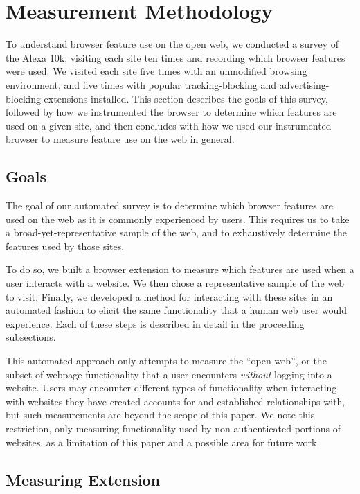 \section{Measurement Methodology}
\label{measurement:methodology}

To understand browser feature use on the open web, we conducted a survey of the
Alexa 10k, visiting each site ten times and recording which browser features
were used.  We visited each site five times with an unmodified browsing
environment, and five times with popular tracking-blocking and
advertising-blocking extensions installed.  This section describes
the goals of this survey, followed by how we instrumented the browser to
determine which features are used on a given site, and then concludes with how
we used our instrumented browser to measure feature use on the web in general.


\subsection{Goals}
The goal of our automated survey is to determine which browser features
are used on the web as it is commonly experienced by users.  This requires us
to take a broad-yet-representative sample of the web, and to exhaustively
determine the features used by those sites.

To do so, we built a browser extension to measure which features are used when
a user interacts with a website. We then chose a representative sample of the
web to visit.  Finally, we developed a method for interacting with these sites in an
automated fashion to elicit the same functionality that a human web
user would experience.  Each of these steps is described in detail
in the proceeding subsections.

This automated approach only attempts to measure the ``open web'', or the
subset of webpage functionality that a user encounters \textit{without} logging
into a website.  Users may encounter different types of functionality when
interacting with websites they have created accounts for and established
relationships with, but such measurements are beyond the scope of this paper.
We note this restriction, only measuring functionality used by non-authenticated
portions of websites, as a limitation of this paper and a possible area for
future work.


\subsection{Measuring Extension}
\label{measurement:methodology:measureextension}

